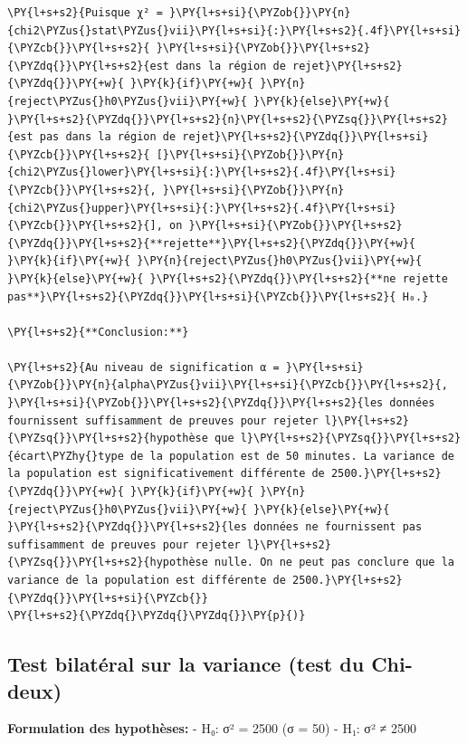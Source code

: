 \begin{tcolorbox}[breakable, size=fbox, boxrule=1pt, pad at break*=1mm,colback=cellbackground, colframe=cellborder]
\begin{Verbatim}[commandchars=\\\{\}]
\PY{l+s+s2}{Puisque χ² = }\PY{l+s+si}{\PYZob{}}\PY{n}{chi2\PYZus{}stat\PYZus{}vii}\PY{l+s+si}{:}\PY{l+s+s2}{.4f}\PY{l+s+si}{\PYZcb{}}\PY{l+s+s2}{ }\PY{l+s+si}{\PYZob{}}\PY{l+s+s2}{\PYZdq{}}\PY{l+s+s2}{est dans la région de rejet}\PY{l+s+s2}{\PYZdq{}}\PY{+w}{ }\PY{k}{if}\PY{+w}{ }\PY{n}{reject\PYZus{}h0\PYZus{}vii}\PY{+w}{ }\PY{k}{else}\PY{+w}{ }\PY{l+s+s2}{\PYZdq{}}\PY{l+s+s2}{n}\PY{l+s+s2}{\PYZsq{}}\PY{l+s+s2}{est pas dans la région de rejet}\PY{l+s+s2}{\PYZdq{}}\PY{l+s+si}{\PYZcb{}}\PY{l+s+s2}{ [}\PY{l+s+si}{\PYZob{}}\PY{n}{chi2\PYZus{}lower}\PY{l+s+si}{:}\PY{l+s+s2}{.4f}\PY{l+s+si}{\PYZcb{}}\PY{l+s+s2}{, }\PY{l+s+si}{\PYZob{}}\PY{n}{chi2\PYZus{}upper}\PY{l+s+si}{:}\PY{l+s+s2}{.4f}\PY{l+s+si}{\PYZcb{}}\PY{l+s+s2}{], on }\PY{l+s+si}{\PYZob{}}\PY{l+s+s2}{\PYZdq{}}\PY{l+s+s2}{**rejette**}\PY{l+s+s2}{\PYZdq{}}\PY{+w}{ }\PY{k}{if}\PY{+w}{ }\PY{n}{reject\PYZus{}h0\PYZus{}vii}\PY{+w}{ }\PY{k}{else}\PY{+w}{ }\PY{l+s+s2}{\PYZdq{}}\PY{l+s+s2}{**ne rejette pas**}\PY{l+s+s2}{\PYZdq{}}\PY{l+s+si}{\PYZcb{}}\PY{l+s+s2}{ H₀.}

\PY{l+s+s2}{**Conclusion:**}

\PY{l+s+s2}{Au niveau de signification α = }\PY{l+s+si}{\PYZob{}}\PY{n}{alpha\PYZus{}vii}\PY{l+s+si}{\PYZcb{}}\PY{l+s+s2}{, }\PY{l+s+si}{\PYZob{}}\PY{l+s+s2}{\PYZdq{}}\PY{l+s+s2}{les données fournissent suffisamment de preuves pour rejeter l}\PY{l+s+s2}{\PYZsq{}}\PY{l+s+s2}{hypothèse que l}\PY{l+s+s2}{\PYZsq{}}\PY{l+s+s2}{écart\PYZhy{}type de la population est de 50 minutes. La variance de la population est significativement différente de 2500.}\PY{l+s+s2}{\PYZdq{}}\PY{+w}{ }\PY{k}{if}\PY{+w}{ }\PY{n}{reject\PYZus{}h0\PYZus{}vii}\PY{+w}{ }\PY{k}{else}\PY{+w}{ }\PY{l+s+s2}{\PYZdq{}}\PY{l+s+s2}{les données ne fournissent pas suffisamment de preuves pour rejeter l}\PY{l+s+s2}{\PYZsq{}}\PY{l+s+s2}{hypothèse nulle. On ne peut pas conclure que la variance de la population est différente de 2500.}\PY{l+s+s2}{\PYZdq{}}\PY{l+s+si}{\PYZcb{}}
\PY{l+s+s2}{\PYZdq{}\PYZdq{}\PYZdq{}}\PY{p}{)}
\end{Verbatim}
\end{tcolorbox}



    \subsection{Test bilatéral sur la variance (test du
Chi-deux)}\label{test-bilatuxe9ral-sur-la-variance-test-du-chi-deux}

\textbf{Formulation des hypothèses:} - H₀: σ² = 2500 (σ = 50) - H₁: σ² ≠
2500


